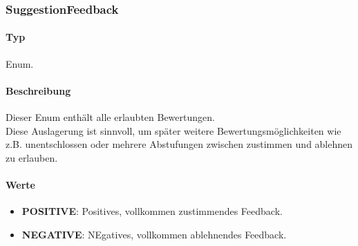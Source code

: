 \subsubsection{SuggestionFeedback}
\paragraph*{Typ}
Enum.
\paragraph*{Beschreibung}
Dieser Enum enthält alle erlaubten Bewertungen.\\
Diese Auslagerung ist sinnvoll, um später weitere Bewertungsmöglichkeiten wie z.B. unentschlossen oder 
mehrere Abstufungen zwischen zustimmen und ablehnen zu erlauben.

\paragraph*{Werte}
\begin{itemize}
    \item \textbf{POSITIVE}: Positives, vollkommen zustimmendes Feedback.
    \item \textbf{NEGATIVE}: NEgatives, vollkommen ablehnendes Feedback.
\end{itemize}
